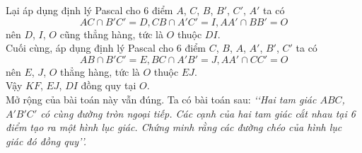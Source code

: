 \begin{bt}
{{
		}\vspace*{-1cm}\noindent
		Lại áp dụng định lý Pascal cho 6 điểm $A$, $C$, $B$, $B'$, $C'$, $A'$ ta có
		$$ AC\cap B'C'=D, CB\cap A'C'=I, AA'\cap BB'=O $$
		nên $D$, $I$, $O$ cũng thẳng hàng, tức là $O$ thuộc $DI$.\\
		Cuối cùng, áp dụng định lý Pascal cho 6 điểm $C$, $B$, $A$, $A'$, $B'$, $C'$ ta có
		$$ AB\cap B'C'=E, BC\cap A'B'=J, AA'\cap CC'=O $$
		nên $E$, $J$, $O$ thẳng hàng, tức là $O$ thuộc $EJ$.\\
		Vậy $KF$, $EJ$, $DI$ đồng quy tại $O$.\\
		Mở rộng của bài toán này vẫn đúng. Ta có bài toán sau: \textit{\lq\lq Hai tam giác $ABC$, $A'B'C'$ có cùng đường tròn ngoại tiếp. Các cạnh của hai tam giác cắt nhau tại 6 điểm tạo ra một hình lục giác. Chứng minh rằng các đường chéo của hình lục giác đó đồng quy\rq\rq.}
	}
\end{bt}

